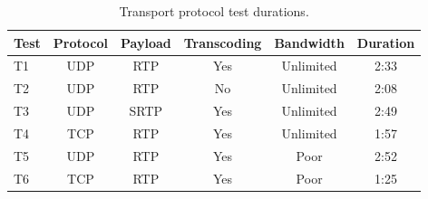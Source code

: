 \begin{table}[H]
    \centering
    \caption{Transport protocol test durations.}
    \label{tab:transport_duration}
    \begin{tabular}{@{}lccccc@{}}
        \toprule
        \textbf{Test} & \textbf{Protocol} & \textbf{Payload} & \textbf{Transcoding} & \textbf{Bandwidth} & \textbf{Duration} \\
        \midrule
        T1 & UDP & RTP  & Yes & Unlimited & 2:33 \\
        T2 & UDP & RTP  & No  & Unlimited & 2:08 \\
        T3 & UDP & SRTP & Yes & Unlimited & 2:49 \\
        T4 & TCP & RTP  & Yes & Unlimited & 1:57 \\
        T5 & UDP & RTP  & Yes & Poor      & 2:52 \\
        T6 & TCP & RTP  & Yes & Poor      & 1:25 \\
        \bottomrule
    \end{tabular}
\end{table}
